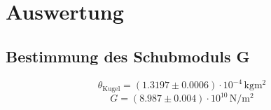 \section{Auswertung}
\label{sec:Auswertung}
\subsection{Bestimmung des Schubmoduls G}
\begin{equation}
	\theta_{\mathrm{Kugel}}=(1.3197\pm 0.0006) \cdot 10^{-4} \,\si{\kilo\gram \square\metre}
\end{equation}
\begin{equation}
	G= (8.987\pm 0.004) \cdot 10^{10}  \,\si{\newton \per \square\metre}
\end{equation}
